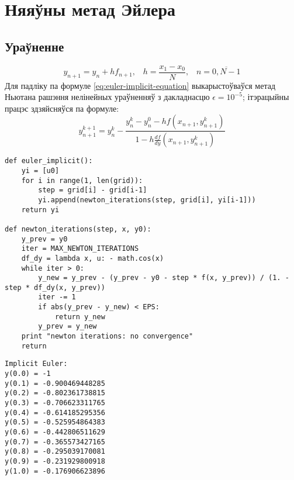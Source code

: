 \section{Няяўны метад Эйлера}
\subsection*{Ураўненне}
\begin{equation} \label{eq:euler-implicit-equation}
y_{n+1} = y_n + hf_{n+1}, \hspace{10pt} h = \frac{x_1-x_0}{N}, \hspace{10pt} n = \overline{0, N-1}
\end{equation}
Для падліку па формуле \eqref{eq:euler-implicit-equation} выкарыстоўваўся метад Ньютана рашэння нелінейных ураўненняў з дакладнасцю $\epsilon = 10^{-5}$; ітэрацыйны працэс здзяйсняўся па формуле:
\begin{equation} \label{eq:newton1}
    y_{n+1}^{k+1} = y_{n}^{k} - \frac{ y_{n}^{k} - y_{n}^{0} - hf(x_{n+1}, y_{n+1}^{k}) }{ 1 - h \frac{df}{dy}(x_{n+1}, y_{n+1}^{k}) }
\end{equation}

{\small
\begin{verbatim}
def euler_implicit():
    yi = [u0]
    for i in range(1, len(grid)):
        step = grid[i] - grid[i-1]
        yi.append(newton_iterations(step, grid[i], yi[i-1]))
    return yi

def newton_iterations(step, x, y0):
    y_prev = y0
    iter = MAX_NEWTON_ITERATIONS
    df_dy = lambda x, u: - math.cos(x)
    while iter > 0:
        y_new = y_prev - (y_prev - y0 - step * f(x, y_prev)) / (1. - step * df_dy(x, y_prev))
        iter -= 1
        if abs(y_prev - y_new) < EPS:
            return y_new
        y_prev = y_new
    print "newton iterations: no convergence"
    return
\end{verbatim}
}

{\small
\begin{verbatim}
Implicit Euler:
y(0.0) = -1
y(0.1) = -0.900469448285
y(0.2) = -0.802361738815
y(0.3) = -0.706623311765
y(0.4) = -0.614185295356
y(0.5) = -0.525954864383
y(0.6) = -0.442806511629
y(0.7) = -0.365573427165
y(0.8) = -0.295039170081
y(0.9) = -0.231929800918
y(1.0) = -0.176906623896
\end{verbatim}
}

